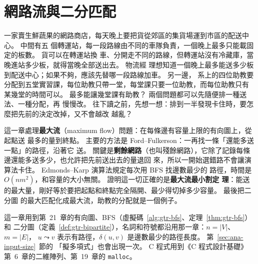 \chapter{網路流與二分匹配}
\label{ch:flw}


一家賣生鮮蔬果的網路商店，每天晚上要把貨從郊區的集貨場運到市區的配送中心。 中間有五
個轉運站，每一段路線由不同的車隊負責，一個晚上最多只能載固定的板數。 貨可以在轉運站換
車、分開走不同的路線，但轉運站沒有冷藏庫，當晚進站多少板，就得當晚全部送出去。 物流經
理想知道一個晚上最多能送多少板到配送中心；如果不夠，應該先替哪一段路線加車。 另一邊，
系上的四位助教要分配到五堂實習課，每位助教只帶一堂，每堂課只要一位助教，而每位助教只有
某幾堂的時間可以。 最多能讓幾堂課有助教？ 兩個問題都可以先隨便排一種送法、一種分配，再
慢慢改。 往下讀之前，先想一想：排到一半發現卡住時，要怎麼把先前的決定改掉，又不會越改
越亂？

這一章處理\textbf{最大流}（maximum flow）問題：在每條邊有容量上限的有向圖上，從起點送
最多的量到終點。 主要的方法是 Ford--Fulkerson：一再找一條「還能多送一點」的路徑，沿著它
送。 關鍵是\textbf{剩餘網路}（也叫殘餘網路），它除了記錄每條邊還能多送多少，也允許把先前送出去的量退回
來，所以一開始選錯路不會讓演算法卡住。 Edmonds--Karp 演算法規定每次用 BFS 找邊數最少的
路徑，時間是 $O(nm^2)$，和容量的大小無關。 證明這一切正確的是\textbf{最大流最小割定
理}：能送的最大量，剛好等於要把起點和終點完全隔開、最少得切掉多少容量。 最後把二分圖
的最大匹配化成最大流，助教的分配就是一個例子。

這一章用到第~21~章的有向圖、BFS（虛擬碼~\ref{alg:gtr-bfs}、定理~\ref{thm:gtr-bfs}）和
二分圖（定義~\ref{def:gtr-bipartite}），名詞和符號都沿用那一章：$n = |V|$、$m = |E|$，
$u \leadsto v$ 表示有路徑，$\delta(u, v)$ 是邊數最少的路徑長度。 第~\ref{sec:ana-input-size}~節的
「擬多項式」也會出現一次。 C 程式用到《C 程式設計基礎》第~6~章的二維陣列、第~19~章的
\texttt{malloc}。

